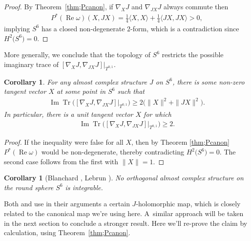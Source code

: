 \documentclass[10pt,a4paper]{amsart}
\DeclareMathOperator{\Tr}{Tr}
\newtheorem{cor}[thm]{Corollary}
\numberwithin{equation}{section}
\begin{document}
\begin{proof}By Theorem~\ref{thm;Pcanon}, if $\nabla_X J$ and $\nabla_{JX} J$ always commute then
\begin{gather*}
P^* (\operatorname{Re} \omega ) (X,JX) = \frac 1 4 \langle X,X\rangle + \frac 1 4 \langle JX,JX\rangle > 0,
\end{gather*}
implying $S^6$ has a closed non-degenerate $2$-form, which is a contradiction since $H^2\big(S^6\big) = 0$.
\end{proof}

More generally, we conclude that the topology of $S^6$ restricts the possible imaginary trace of $ [ \nabla_X J , \nabla_{JX} J ] \big|_{T^{0,1}} $.

\begin{cor}For any almost complex structure $J$ on $S^6$, there is some non-zero tangent vector $X$ at some point in $S^6$ such that
\begin{gather*}
\operatorname{Im} \Tr \big( [ \nabla_X J , \nabla_{JX} J] \big|_{T^{0,1}} \big) \geq 2 \big( \|X \|^2 + \|JX \|^2 \big).
\end{gather*}
In particular, there is a unit tangent vector $X$ for which
\begin{gather*}
\operatorname{Im} \Tr \big( [ \nabla_X J , \nabla_{JX} J ] \big|_{T^{0,1}} \big) \geq 2.
\end{gather*}
\end{cor}

\begin{proof}
If the inequality were false for all $X$, then by Theorem \ref{thm;Pcanon} $P^*(\operatorname{Re} \omega)$ would be non-degenerate, thereby contradicting $H^2\big(S^6\big) = 0$. The second case follows from the first with $\|X\|=1$.
\end{proof}

\begin{cor}[Blanchard \cite{Bl}, Lebrun \cite{L}] \label{cor;L}No orthogonal almost complex structure on the round sphere $S^6$ is integrable.
\end{cor}

Both \cite{Bl} and \cite{L} use in their arguments a certain $J$-holomorphic map, which is closely related to the canonical map we're using here. A~similar approach will be taken in the next section to conclude a stronger result. Here we'll re-prove the claim by calculation, using Theorem~\ref{thm;Pcanon}.
\end{document}
